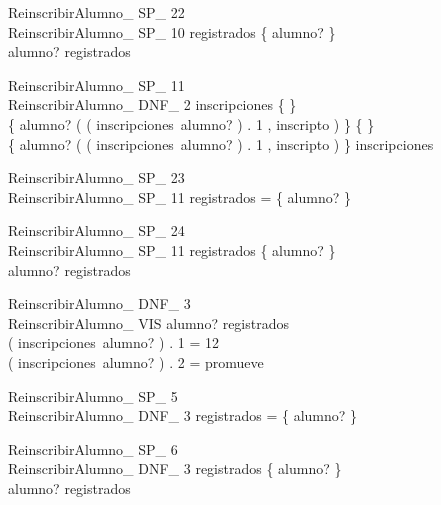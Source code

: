 \documentclass{article}
\begin{document}
\begin{schema}{ReinscribirAlumno\_ SP\_ 22}\\
 ReinscribirAlumno\_ SP\_ 10 
\where
 registrados \neq \{ alumno? \} \\
 alumno? \in registrados
\end{schema}


\begin{schema}{ReinscribirAlumno\_ SP\_ 11}\\
 ReinscribirAlumno\_ DNF\_ 2 
\where
 inscripciones \neq \{ \} \\
 \{ alumno? \mapsto ( ( inscripciones~alumno? ) . 1 , inscripto ) \} \neq \{ \} \\
 \dom \{ alumno? \mapsto ( ( inscripciones~alumno? ) . 1 , inscripto ) \} \subset \dom inscripciones
\end{schema}


\begin{schema}{ReinscribirAlumno\_ SP\_ 23}\\
 ReinscribirAlumno\_ SP\_ 11 
\where
 registrados = \{ alumno? \}
\end{schema}


\begin{schema}{ReinscribirAlumno\_ SP\_ 24}\\
 ReinscribirAlumno\_ SP\_ 11 
\where
 registrados \neq \{ alumno? \} \\
 alumno? \in registrados
\end{schema}


\begin{schema}{ReinscribirAlumno\_ DNF\_ 3}\\
 ReinscribirAlumno\_ VIS 
\where
 alumno? \in registrados \\
 ( inscripciones~alumno? ) . 1 = 12 \\
 ( inscripciones~alumno? ) . 2 = promueve
\end{schema}


\begin{schema}{ReinscribirAlumno\_ SP\_ 5}\\
 ReinscribirAlumno\_ DNF\_ 3 
\where
 registrados = \{ alumno? \}
\end{schema}


\begin{schema}{ReinscribirAlumno\_ SP\_ 6}\\
 ReinscribirAlumno\_ DNF\_ 3 
\where
 registrados \neq \{ alumno? \} \\
 alumno? \in registrados
\end{schema}
\end{document}
